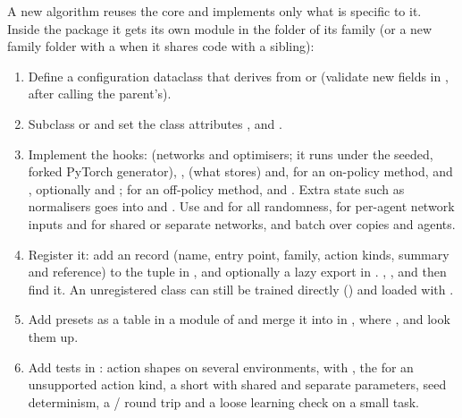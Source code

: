 A new algorithm reuses the core and implements only what is specific to it.
Inside the package it gets its own module in the folder of its family (or a
new family folder with a  when it shares code with a sibling):

\begin{enumerate}
  \item Define a configuration dataclass that derives from
     or  (validate new fields in
    , after calling the parent's).
  \item Subclass  or  and set
    the class attributes ,  and
    .
  \item Implement the hooks:  (networks and optimisers; it runs
    under the seeded, forked PyTorch generator), ,  (what  stores) and,
    for an on-policy method,  and
    , optionally  and
    ; for an off-policy method,
     and . Extra state such as
    normalisers goes into  and
    . Use  and
     for all randomness,  for
    per-agent network inputs and  for shared or separate
    networks, and batch over copies and agents.
  \item Register it: add an  record (name,
     entry point, family, action kinds, summary and
    reference) to the tuple in , and optionally a
    lazy export in . ,
    ,  and  then
    find it. An unregistered class can still be trained directly
    () and loaded with
    .
  \item Add presets as a table  in a
    module of  and merge it into  in
    , where ,  and
     look them up.
  \item Add tests in : action shapes on several
    environments,  with , the
     for an unsupported action kind, a short  with
    shared and separate parameters, seed determinism, a /
    round trip and a loose learning check on a small task.
\end{enumerate}

